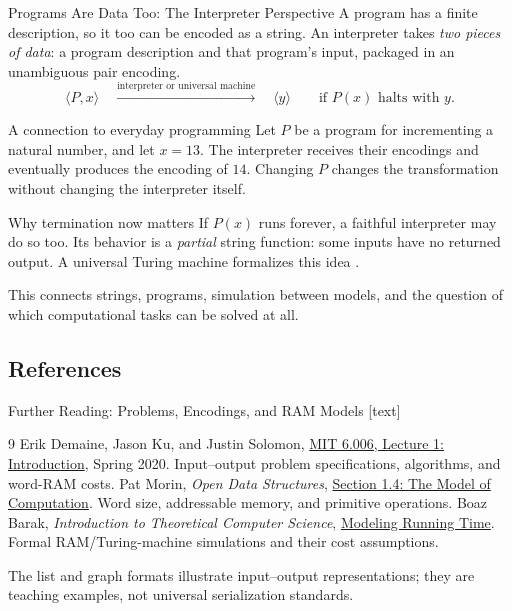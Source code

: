 \documentclass[10pt]{beamer}
\begin{document}
\begin{frame}{Programs Are Data Too: The Interpreter Perspective}
  \small
  A program has a finite description, so it too can be encoded as a string.
  An interpreter takes \emph{two pieces of data}: a program description and
  that program's input, packaged in an unambiguous pair encoding.
  \[
    \langle P,x\rangle
      \quad\xrightarrow{\text{interpreter or universal machine}}\quad
      \langle y\rangle
      \qquad\text{if }P(x)\text{ halts with }y.
  \]
  \pause
  \begin{exampleblock}{A connection to everyday programming}
    Let $P$ be a program for incrementing a natural number, and let $x=13$.
    The interpreter receives their encodings and eventually produces the
    encoding of $14$. Changing $P$ changes the transformation without
    changing the interpreter itself.
  \end{exampleblock}
  \pause
  \begin{block}{Why termination now matters}
    If $P(x)$ runs forever, a faithful interpreter may do so too.
    Its behavior is a \emph{partial} string function: some inputs have no
    returned output. A universal Turing machine formalizes this idea
    \cite{universal-machine}.
  \end{block}
  This connects strings, programs, simulation between models, and the
  question of which computational tasks can be solved at all.
\end{frame}

\subsection{References}

\begin{frame}{Further Reading: Problems, Encodings, and RAM Models}
  \small
  [text]
  \begin{thebibliography}{9}
      Erik Demaine, Jason Ku, and Justin Solomon,
      \href{https://ocw.mit.edu/courses/6-006-introduction-to-algorithms-spring-2020/477c78e0af2df61fa205bcc6cb613ceb_MIT6_006S20_lec1.pdf}
      {MIT 6.006, Lecture 1: Introduction}, Spring 2020.
      Input--output problem specifications, algorithms, and word-RAM costs.
      Pat Morin, \emph{Open Data Structures},
      \href{https://opendatastructures.org/ods-cpp/1_4_Model_Computation.html}
      {Section 1.4: The Model of Computation}.
      Word size, addressable memory, and primitive operations.
      Boaz Barak, \emph{Introduction to Theoretical Computer Science},
      \href{https://introtcs.org/public/lec_11_running_time.html}
      {Modeling Running Time}.
      Formal RAM/Turing-machine simulations and their cost assumptions.
  \end{thebibliography}
  The list and graph formats illustrate input--output representations;
  they are teaching examples, not universal serialization standards.
\end{frame}
\end{document}
